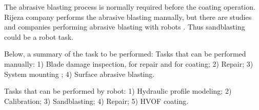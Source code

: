 The abrasive blasting process is normally required before the coating
operation. %
Rijeza company performs the abrasive blasting manually, but there are studies
and companies performing abrasive blasting with robots \citep{ren2008path}. Thus
sandblasting could be a robot task.


Below, a summary of the task to be performed:
Tasks that can be performed manually: 1) Blade damage inspection, for repair and
for coating; 2) Repair; 3) System mounting ; 4) Surface abrasive blasting.

Tasks that can be performed by robot: 1) Hydraulic profile modeling; 2)
Calibration; 3) Sandblasting; 4) Repair; 5) HVOF coating.
